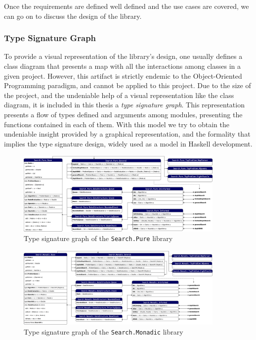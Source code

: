 \newpage


Once the requirements are defined well defined and the use cases are covered,
we can go on to discuss the design of the library.

\subsubsection{Type Signature Graph}

To provide a visual representation of the library's design, one usually defines
a class diagram that presents a map with all the interactions among classes in
a given project. However, this artifact is strictly endemic to the
Object-Oriented Programming paradigm, and cannot be applied to this project.
Due to the size of the project, and the undeniable help of a visual
representation like the class diagram, it is included in this thesis a
\textit{type signature graph}. This representation presents a flow of types
defined and arguments among modules, presenting the functions contained in each
of them. With this model we try to obtain the undeniable insight provided by a
graphical representation, and the formality that implies the type signature
design, widely used as a model in Haskell development. \\

\begin{figure}
  \centering
  \includegraphics[width=0.9\textwidth]{img/type-graph-pure.png}
  \vspace{1cm}
  \caption{Type signature graph of the \texttt{Search.Pure} library}
  \label{graph-pure}
\end{figure}

\begin{figure}
  \centering
  \includegraphics[width=0.9\textwidth]{img/type-graph-monadic.png}
  \vspace{1cm}
  \caption{Type signature graph of the \texttt{Search.Monadic} library}
  \label{graph-monadic}
\end{figure}

